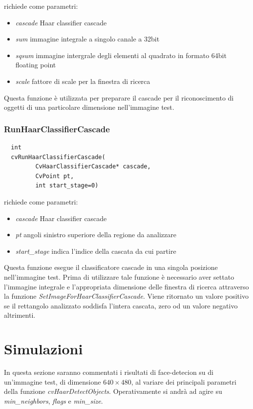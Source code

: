 \documentclass[a4paper,11pt]{article}
\begin{document}
richiede come parametri:

\begin{itemize}
\item \emph{cascade} Haar classifier cascade 
\item \emph{sum} immagine integrale a singolo canale a 32bit
\item \emph{sqsum} immagine intergrale degli elementi al quadrato in
  formato 64bit floating point
\item \emph{scale} fattore di scale per la finestra di ricerca
\end{itemize}

Questa funzione è utilizzata per preparare il cascade per il
riconoscimento di oggetti di una particolare dimensione nell'immagine
test.

\subsubsection{RunHaarClassifierCascade}
\label{sec:run}

\begin{lstlisting}
  int
  cvRunHaarClassifierCascade(
         CvHaarClassifierCascade* cascade,
         CvPoint pt, 
         int start_stage=0)
\end{lstlisting}

richiede come parametri:

\begin{itemize}
\item \emph{cascade} Haar classifier cascade
\item \emph{pt} angoli sinistro superiore della regione da analizzare
\item \emph{start\_stage} indica l'indice della cascata da cui partire
\end{itemize}

Questa funzione esegue il classificatore cascade in una singola
posizione nell'immagine test. Prima di utilizzare tale funzione è
necessario aver settato l'immagine integrale e l'appropriata
dimensione delle finestra di ricerca attraverso la funzione
\emph{SetImageForHaarClassifierCascade}. Viene ritornato un valore
positivo se il rettangolo analizzato soddisfa l'intera cascata, zero
od un valore negativo altrimenti.


\section{Simulazioni}
\label{sec:simulazioni}
In questa sezione saranno commentati i risultati di face-detecion su
di un'immagine test, di dimensione $640\times480$, al variare dei
principali parametri della funzione
\emph{cvHaarDetectObjects}. Operativamente si andrà ad agire su
\emph{min\_neighbors}, \emph{flags} e \emph{min\_size}.
\end{document}
